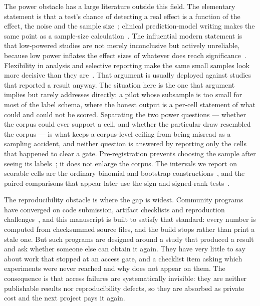 The power obstacle has a large literature outside this field. The elementary
statement is that a test's chance of detecting a real effect is a function of
the effect, the noise and the sample size~\cite{cohen1992power}; clinical
prediction-model writing makes the same point as a sample-size
calculation~\cite{riley2020sample,collins2015tripod}. The influential modern
statement is that low-powered studies are not merely inconclusive but actively
unreliable, because low power inflates the effect sizes of whatever does reach
significance~\cite{button2013power,ioannidis2005why,openscience2015repro}.
Flexibility in analysis and selective reporting make the same small samples
look more decisive than they
are~\cite{simmons2011false,gelman2014garden,head2015phacking,amrhein2019retire}.
That argument is usually deployed against studies that reported a result
anyway. The situation here is the one that argument implies but rarely
addresses directly: a pilot whose subsample is too small for most of the label
schema, where the honest output is a per-cell statement of what could and
could not be scored. Separating the two power questions --- whether the corpus
could ever support a cell, and whether the particular draw resembled the
corpus --- is what keeps a corpus-level ceiling from being misread as a
sampling accident, and neither question is answered by reporting only the
cells that happened to clear a gate. Pre-registration prevents choosing the
sample after seeing its labels~\cite{nosek2018preregistration,munafo2017manifesto};
it does not enlarge the corpus. The intervals we report on scorable cells are
the ordinary binomial and bootstrap
constructions~\cite{clopper1934use,efron1979bootstrap}, and the paired
comparisons that appear later use the sign and signed-rank
tests~\cite{dixon1946sign,wilcoxon1945individual}.

The reproducibility obstacle is where the gap is widest. Community programs
have converged on code submission, artifact checklists and reproduction
challenges~\cite{pineau2021improving,peng2011reproducible,baker2016reproducibility,
goodman2016mean,landis2012transparent}, and this manuscript is built to satisfy
that standard: every number is computed from checksummed source files, and the
build stops rather than print a stale one. But such programs are designed
around a study that produced a result and ask whether someone else can obtain
it again. They have very little to say about work that stopped at an access
gate, and a checklist item asking which experiments were never reached and why
does not appear on them. The consequence is that access failures are
systematically invisible: they are neither publishable results nor
reproducibility defects, so they are absorbed as private cost and the next
project pays it again.

